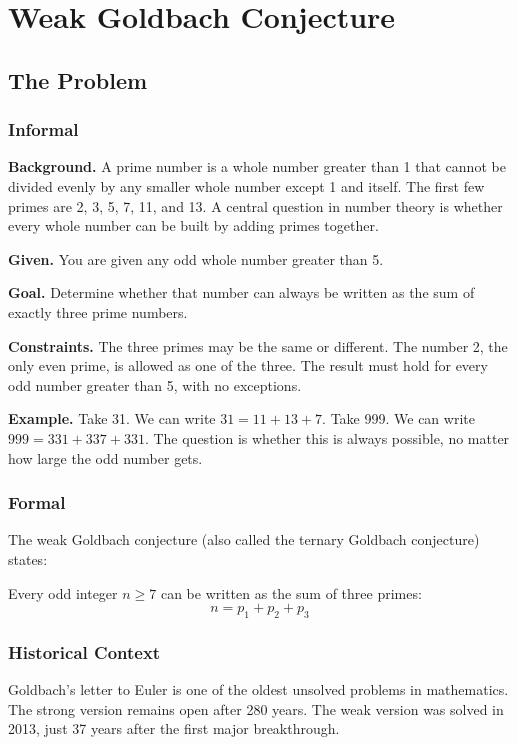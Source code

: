 \let\LocalMacro\relax

\chapter{Weak Goldbach Conjecture}

\section{The Problem}

\subsection{Informal}

\textbf{Background.} A prime number is a whole number greater than 1 that cannot be divided evenly by any smaller whole number except 1 and itself. The first few primes are 2, 3, 5, 7, 11, and 13. A central question in number theory is whether every whole number can be built by adding primes together.

\textbf{Given.} You are given any odd whole number greater than 5.

\textbf{Goal.} Determine whether that number can always be written as the sum of exactly three prime numbers.

\textbf{Constraints.} The three primes may be the same or different. The number 2, the only even prime, is allowed as one of the three. The result must hold for every odd number greater than 5, with no exceptions.

\textbf{Example.} Take 31. We can write $31 = 11 + 13 + 7$. Take 999. We can write $999 = 331 + 337 + 331$. The question is whether this is always possible, no matter how large the odd number gets.

\subsection{Formal}
The weak Goldbach conjecture (also called the ternary Goldbach conjecture) states:
\begin{conjecture}
Every odd integer $n \geq 7$ can be written as the sum of three primes:
\[
n = p_1 + p_2 + p_3
\]
\end{conjecture}

\subsection{Historical Context}
Goldbach's letter to Euler is one of the oldest unsolved problems in mathematics. The strong version remains open after 280 years. The weak version was solved in 2013, just 37 years after the first major breakthrough.

